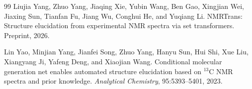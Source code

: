 \documentclass{article}
\begin{document}
{\begin{thebibliography}{99}
Liujia Yang, Zhuo Yang, Jiaqing Xie, Yubin Wang, Ben Gao, Xingjian Wei, Jiaxing Sun, Tianfan Fu, Jiang Wu, Conghui He, and Yuqiang Li.
NMRTrans: Structure elucidation from experimental NMR spectra via set transformers.
Preprint, 2026.

Lin Yao, Minjian Yang, Jianfei Song, Zhuo Yang, Hanyu Sun, Hui Shi, Xue Liu, Xiangyang Ji, Yafeng Deng, and Xiaojian Wang.
Conditional molecular generation net enables automated structure elucidation based on \(^{13}\)C NMR spectra and prior knowledge.
\textit{Analytical Chemistry}, 95:5393--5401, 2023.

\end{thebibliography}
}
\end{document}

